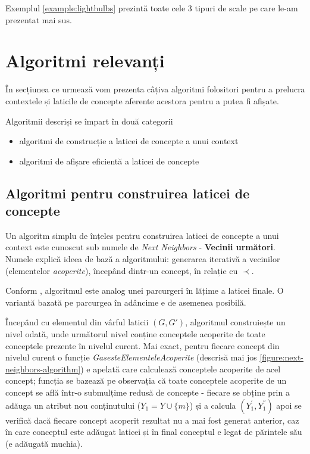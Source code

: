 \documentclass[12pt, a4paper, twoside, romanian]{teza-upb}
\begin{document}
  Exemplul \ref{example:lightbulbs} prezintă toate cele 3 tipuri de scale pe care le-am prezentat mai sus.

  \section{Algoritmi relevanți}

    În secțiunea ce urmează vom prezenta câțiva algoritmi folositori pentru a prelucra contextele și laticile de concepte aferente acestora pentru a putea fi afișate.

    Algoritmii descriși se împart în două categorii
    \begin{itemize}
      \item algoritmi de construcție a laticei de concepte a unui context
      \item algoritmi de afișare eficientă a laticei de concepte
    \end{itemize}

    
    \subsection{Algoritmi pentru construirea laticei de concepte}

    Un algoritm simplu de înțeles pentru construirea laticei de concepte a unui context este cunoscut sub numele de \textit{Next Neighbors} - \textbf{Vecinii următori}. Numele explică ideea de bază a algoritmului: generarea iterativă a vecinilor (elementelor \textit{acoperite}), începând dintr-un concept, în relație cu $\prec$.

    Conform \cite{Carpineto:2004:CDA:975252}, algoritmul este analog unei parcurgeri în lățime a laticei finale. O variantă bazată pe parcurgea în adâncime e de asemenea posibilă.

      Începând cu elementul din vârful laticii $(G, G')$, algoritmul construiește un nivel odată, unde următorul nivel conține conceptele acoperite de toate conceptele prezente în nivelul curent. Mai exact, pentru fiecare concept din nivelul curent o funcție \textit{GasesteElementeleAcoperite} (descrisă mai jos \ref{figure:next-neighbors-algorithm}) e apelată care calculează conceptele acoperite de acel concept; funcția se bazează pe observația că toate conceptele acoperite de un concept se află într-o submulțime redusă de concepte - fiecare se obține prin a adăuga un atribut nou conținutului ($Y_1 = Y \cup \{m\}$) și a calcula $(Y_{1}^{'}, Y_{1}^{''})$  apoi se verifică dacă fiecare concept acoperit rezultat nu a mai fost generat anterior, caz în care conceptul este adăugat laticei și în final conceptul e legat de părintele său (e adăugată muchia).
\end{document}
